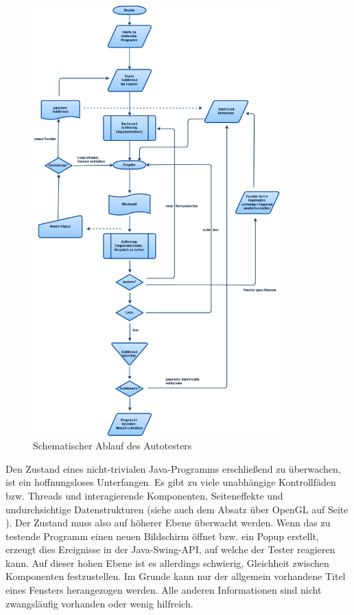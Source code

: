 \begin{figure}
	\centering
	\includegraphics[width=0.85\textwidth]{bilder/autotester.png}
	\caption{Schematischer Ablauf des Autotesters}
	\label{fig:autotesterschematic}
\end{figure}

Den Zustand eines nicht-trivialen Java-Programms erschließend
zu überwachen, ist ein hoffnungsloses Unterfangen. Es gibt zu
viele unabhängige Kontrollfäden bzw. Threads und interagierende
Komponenten, Seiteneffekte und undurchsichtige Datenstrukturen
(siehe auch dem Absatz über OpenGL auf Seite \pageref{openglQQ}).
Der Zustand muss also auf höherer Ebene überwacht werden.
Wenn das zu testende Programm einen neuen Bildschirm öffnet
bzw. ein Popup erstellt, erzeugt dies Ereignisse in der Java-Swing-API,
auf welche der Tester reagieren kann. Auf dieser hohen Ebene ist
es allerdings schwierig, Gleichheit zwischen Komponenten
festzustellen. Im Grunde kann nur der allgemein vorhandene Titel
eines Fensters herangezogen werden. Alle anderen Informationen
sind nicht zwangsläufig vorhanden oder wenig hilfreich.

